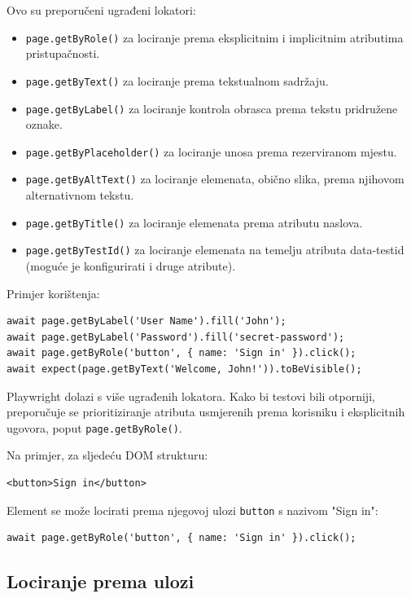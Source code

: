 Ovo su preporučeni ugrađeni lokatori:

\begin{itemize}
  \item \texttt{page.getByRole()} za lociranje prema eksplicitnim i implicitnim atributima pristupačnosti.
  \item \texttt{page.getByText()} za lociranje prema tekstualnom sadržaju.
  \item \texttt{page.getByLabel()} za lociranje kontrola obrasca prema tekstu pridružene oznake.
  \item \texttt{page.getByPlaceholder()} za lociranje unosa prema rezerviranom mjestu.
  \item \texttt{page.getByAltText()} za lociranje elemenata, obično slika, prema njihovom alternativnom tekstu.
  \item \texttt{page.getByTitle()} za lociranje elemenata prema atributu naslova.
  \item \texttt{page.getByTestId()} za lociranje elemenata na temelju atributa data-testid (moguće je konfigurirati i druge atribute).
\end{itemize}

Primjer korištenja:

\begin{verbatim}
await page.getByLabel('User Name').fill('John');
await page.getByLabel('Password').fill('secret-password');
await page.getByRole('button', { name: 'Sign in' }).click();
await expect(page.getByText('Welcome, John!')).toBeVisible();
\end{verbatim}

Playwright dolazi s više ugrađenih lokatora. Kako bi testovi bili otporniji, preporučuje se prioritiziranje atributa usmjerenih prema korisniku i eksplicitnih ugovora, poput \texttt{page.getByRole()}.

Na primjer, za sljedeću DOM strukturu:

\begin{verbatim}
<button>Sign in</button>
\end{verbatim}

Element se može locirati prema njegovoj ulozi \texttt{button} s nazivom "Sign in":

\begin{verbatim}
await page.getByRole('button', { name: 'Sign in' }).click();
\end{verbatim}

\subsection*{Lociranje prema ulozi}

